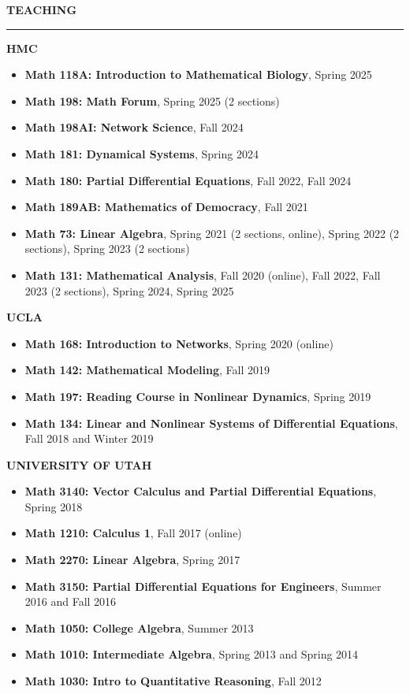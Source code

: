 \documentclass{resume} %
\renewenvironment{rSection}[1]{
\sectionskip
\textcolor{WinePurple}{\MakeUppercase{#1}}
\sectionlineskip
\hrule
\begin{list}{}{
\setlength{\leftmargin}{1.5em}
}
\item[]
}{
\end{list}
}
\begin{document}
\begin{rSection}{\bf Teaching}

\medskip

{\bf HMC}

    \begin{itemize}
    \item \textbf{Math 118A: Introduction to Mathematical Biology}, Spring 2025
    \item \textbf{Math 198: Math Forum}, Spring 2025 (2 sections)
    \item \textbf{Math 198AI: Network Science}, Fall 2024
    \item \textbf{Math 181: Dynamical Systems}, Spring 2024
    \item \textbf{Math 180: Partial Differential Equations}, Fall 2022, Fall 2024
    \item \textbf{Math 189AB: Mathematics of Democracy}, Fall 2021
    \item \textbf{Math 73: Linear Algebra}, Spring 2021 (2 sections, online), Spring 2022 (2 sections), Spring 2023 (2 sections)
    \item \textbf{Math 131: Mathematical Analysis}, Fall 2020 (online), Fall 2022, Fall 2023 (2 sections), Spring 2024, Spring 2025
    \end{itemize}

{\bf UCLA}

    \begin{itemize}
    \item \textbf{Math 168: Introduction to Networks}, Spring 2020 (online)
    \item \textbf{Math 142: Mathematical Modeling}, Fall 2019
    \item \textbf{Math 197: Reading Course in Nonlinear Dynamics}, Spring 2019
    \item \textbf{Math 134: Linear and Nonlinear Systems of Differential Equations}, Fall 2018 and Winter 2019
    \end{itemize}

\uppercase{{\bf University of Utah}}

    \begin{itemize}
    \item \textbf{Math 3140: Vector Calculus and Partial Differential Equations}, Spring 2018
    \item \textbf{Math 1210: Calculus 1}, Fall 2017 (online)
    \item \textbf{Math 2270: Linear Algebra}, Spring 2017 
    \item \textbf{Math 3150: Partial Differential Equations for Engineers}, Summer 2016 and Fall 2016
    \item \textbf{Math 1050: College Algebra}, Summer 2013
    \item \textbf{Math 1010: Intermediate Algebra}, Spring 2013 and Spring 2014
    \item \textbf{Math 1030: Intro to Quantitative Reasoning}, Fall 2012
    \end{itemize}

\end{rSection}
\end{document}
